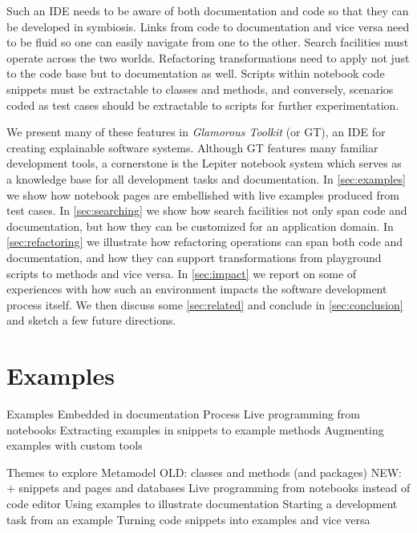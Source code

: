 \documentclass[acmsmall,screen,authorversion,nonacm]{acmart} %
\begin{document}
Such an IDE needs to be aware of both documentation and code so that they can be developed in symbiosis. Links from  code to documentation and vice versa need to be fluid so one can easily navigate from one to the other. Search facilities must operate across the two worlds. Refactoring transformations need to apply not just to  the code base but to documentation as well. Scripts within notebook code snippets must be extractable to classes and methods, and conversely, scenarios  coded as test cases should be extractable to scripts for further experimentation.

We present many of these features in \emph{Glamorous Toolkit} (or GT), an IDE for creating explainable software systems. Although GT features many familiar development tools, a cornerstone is the Lepiter notebook system which serves as a knowledge base for all development tasks and documentation. In \autoref{sec:examples} we show how notebook pages are embellished with live examples produced from test cases. In \autoref{sec:searching} we show how search facilities not only span code and documentation, but how they can be customized for an application domain. In \autoref{sec:refactoring} we illustrate how refactoring operations can span both code and documentation, and how they can support transformations from playground scripts to methods and vice versa. In \autoref{sec:impact} we report on some of experiences with how such an environment impacts the software development process itself. We then discuss some \autoref{sec:related} and conclude in \autoref{sec:conclusion} and sketch a few future directions.

\section{Examples}\label{sec:examples}

\begin{code}
Examples
	Embedded in documentation
	Process
		Live programming from notebooks
		Extracting examples in snippets to example methods
	Augmenting examples with custom tools

Themes to explore
	Metamodel
		OLD: classes and methods (and packages)
		NEW: + snippets and pages and databases
	Live programming from notebooks instead of code editor
	Using examples to illustrate documentation
	Starting a development task from an example
	Turning code snippets into examples and vice versa
\end{code}
\end{document}
